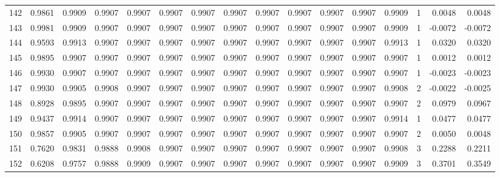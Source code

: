 \begin{tabular}{lrrrrrrrrrrrrrrr}
142 &      0.9861 &  0.9909 &  0.9907 &  0.9907 &  0.9907 &  0.9907 &  0.9907 &  0.9907 &  0.9907 &  0.9907 &   0.9907 &     0.9909 &      1 &                    0.0048 &                     0.0048 \\
143 &      0.9981 &  0.9909 &  0.9907 &  0.9907 &  0.9907 &  0.9907 &  0.9907 &  0.9907 &  0.9907 &  0.9907 &   0.9907 &     0.9909 &      1 &                   -0.0072 &                    -0.0072 \\
144 &      0.9593 &  0.9913 &  0.9907 &  0.9907 &  0.9907 &  0.9907 &  0.9907 &  0.9907 &  0.9907 &  0.9907 &   0.9907 &     0.9913 &      1 &                    0.0320 &                     0.0320 \\
145 &      0.9895 &  0.9907 &  0.9907 &  0.9907 &  0.9907 &  0.9907 &  0.9907 &  0.9907 &  0.9907 &  0.9907 &   0.9907 &     0.9907 &      1 &                    0.0012 &                     0.0012 \\
146 &      0.9930 &  0.9907 &  0.9907 &  0.9907 &  0.9907 &  0.9907 &  0.9907 &  0.9907 &  0.9907 &  0.9907 &   0.9907 &     0.9907 &      1 &                   -0.0023 &                    -0.0023 \\
147 &      0.9930 &  0.9905 &  0.9908 &  0.9907 &  0.9907 &  0.9907 &  0.9907 &  0.9907 &  0.9907 &  0.9907 &   0.9907 &     0.9908 &      2 &                   -0.0022 &                    -0.0025 \\
148 &      0.8928 &  0.9895 &  0.9907 &  0.9907 &  0.9907 &  0.9907 &  0.9907 &  0.9907 &  0.9907 &  0.9907 &   0.9907 &     0.9907 &      2 &                    0.0979 &                     0.0967 \\
149 &      0.9437 &  0.9914 &  0.9907 &  0.9907 &  0.9907 &  0.9907 &  0.9907 &  0.9907 &  0.9907 &  0.9907 &   0.9907 &     0.9914 &      1 &                    0.0477 &                     0.0477 \\
150 &      0.9857 &  0.9905 &  0.9907 &  0.9907 &  0.9907 &  0.9907 &  0.9907 &  0.9907 &  0.9907 &  0.9907 &   0.9907 &     0.9907 &      2 &                    0.0050 &                     0.0048 \\
151 &      0.7620 &  0.9831 &  0.9888 &  0.9908 &  0.9907 &  0.9907 &  0.9907 &  0.9907 &  0.9907 &  0.9907 &   0.9907 &     0.9908 &      3 &                    0.2288 &                     0.2211 \\
152 &      0.6208 &  0.9757 &  0.9888 &  0.9909 &  0.9907 &  0.9907 &  0.9907 &  0.9907 &  0.9907 &  0.9907 &   0.9907 &     0.9909 &      3 &                    0.3701 &                     0.3549 \\

\end{tabular}
